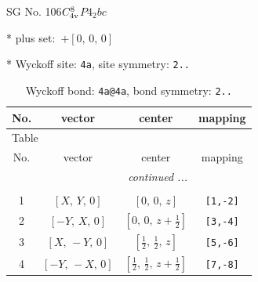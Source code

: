 \documentclass[fleqn,8pt]{jsarticle}
\begin{document}
\setcounter{MaxMatrixCols}{32}

\renewcommand{\tablename}{Table~}
\renewcommand{\figurename}{Figure~}
\begin{center}
\LARGE
SG No. 106\quad$C_{\rm 4v}^{8}$\quad$P4_2bc$\quad[ tetragonal ]
\end{center}

* plus set:\,\,\,$+\left[ 0,\, 0,\, 0 \right]$


* Wyckoff site: {\tt 4a}, site symmetry: {\tt 2..}
\renewcommand{\arraystretch}{1.2}
\begin{longtable}{cccc}
\caption{Wyckoff bond: {\tt 4a@4a}, bond symmetry: {\tt 2..}}
 \\
 \hline \hline
No. & vector & center & mapping \\ \hline \endfirsthead

\multicolumn{3}{l}{\tablename\ \thetable{}} \\
 \hline \hline
No. & vector & center & mapping \\ \hline \endhead

 \hline \hline
\multicolumn{3}{r}{\footnotesize\it continued ...} \\ \endfoot

 \hline \hline
\multicolumn{3}{r}{} \\ \endlastfoot

1 & $\left[ X,\, Y,\, 0 \right]$ & $\left[ 0,\, 0,\, z \right]$ & {\tt [1,-2]} \\ \hline
2 & $\left[ - Y,\, X,\, 0 \right]$ & $\left[ 0,\, 0,\, z + \frac{1}{2} \right]$ & {\tt [3,-4]} \\ \hline
3 & $\left[ X,\, - Y,\, 0 \right]$ & $\left[ \frac{1}{2},\, \frac{1}{2},\, z \right]$ & {\tt [5,-6]} \\ \hline
4 & $\left[ - Y,\, - X,\, 0 \right]$ & $\left[ \frac{1}{2},\, \frac{1}{2},\, z + \frac{1}{2} \right]$ & {\tt [7,-8]} \\
\end{longtable}
\renewcommand{\arraystretch}{1.2}
\end{document}
